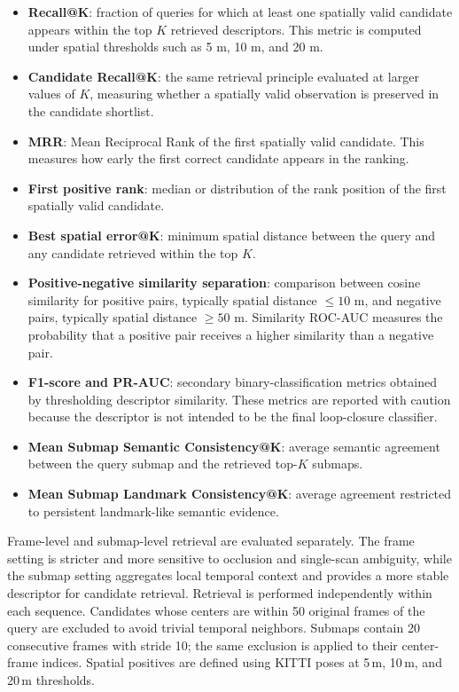 \begin{itemize}
    \item \textbf{Recall@K}: fraction of queries for which at least one spatially valid candidate appears within the top $K$ retrieved descriptors. This metric is computed under spatial thresholds such as 5 m, 10 m, and 20 m.
    \item \textbf{Candidate Recall@K}: the same retrieval principle evaluated at larger values of $K$, measuring whether a spatially valid observation is preserved in the candidate shortlist.
    \item \textbf{MRR}: Mean Reciprocal Rank of the first spatially valid candidate. This measures how early the first correct candidate appears in the ranking.
    \item \textbf{First positive rank}: median or distribution of the rank position of the first spatially valid candidate.
    \item \textbf{Best spatial error@K}: minimum spatial distance between the query and any candidate retrieved within the top $K$.
    \item \textbf{Positive-negative similarity separation}: comparison between cosine similarity for positive pairs, typically spatial distance $\leq 10$ m, and negative pairs, typically spatial distance $\geq 50$ m. Similarity ROC-AUC measures the probability that a positive pair receives a higher similarity than a negative pair.
    \item \textbf{F1-score and PR-AUC}: secondary binary-classification metrics obtained by thresholding descriptor similarity. These metrics are reported with caution because the descriptor is not intended to be the final loop-closure classifier.
    \item \textbf{Mean Submap Semantic Consistency@K}: average semantic agreement between the query submap and the retrieved top-$K$ submaps.
    \item \textbf{Mean Submap Landmark Consistency@K}: average agreement restricted to persistent landmark-like semantic evidence. 
\end{itemize}

Frame-level and submap-level retrieval are evaluated separately. The frame setting is stricter and more sensitive to occlusion and single-scan ambiguity, while the submap setting aggregates local temporal context and provides a more stable descriptor for candidate retrieval.
Retrieval is performed independently within each sequence. Candidates whose centers are within 50 original frames of the query are excluded to avoid trivial temporal neighbors. Submaps contain 20 consecutive frames with stride 10; the same exclusion is applied to their center-frame indices. Spatial positives are defined using KITTI poses at 5\,m, 10\,m, and 20\,m thresholds.

